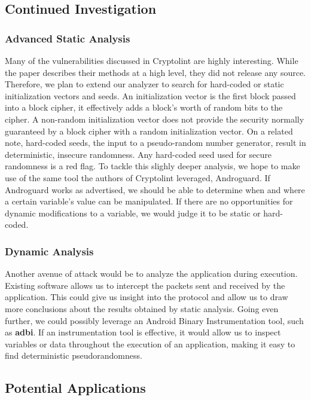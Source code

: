 \documentclass[11pt]{article}
\numberwithin{theorem}{subsection}
\begin{document}
\subsection{Continued Investigation}

\subsubsection{Advanced Static Analysis}
  Many of the vulnerabilities discussed in Cryptolint are highly interesting. While the paper describes their methods at a high level, they did not
release any source. Therefore, we plan to extend our analyzer to search for hard-coded or static initialization vectors and seeds. An initialization vector
is the first block passed into a block cipher, it effectively adds a block's worth of random bits to the cipher. A non-random initialization vector
does not provide the security normally guaranteed by a block cipher with a random initialization vector. On a related note, hard-coded seeds,
the input to a pseudo-random number generator, result in deterministic, insecure randomness. Any hard-coded seed used for secure randomness
is a red flag.
  To tackle this slighly deeper analysis, we hope to make use of the same tool the authors of Cryptolint leveraged, Androguard. If Androguard works
as advertised, we should be able to determine when and where a certain variable's value can be manipulated. If there are no opportunities for dynamic modifications
to a variable, we would judge it to be static or hard-coded.

\subsubsection{Dynamic Analysis}

  Another avenue of attack would be to analyze the application during execution. Existing software allows us to intercept the packets sent
and received by the application. This could give us insight into the protocol and allow us to draw more conclusions about the results
obtained by static analysis. Going even further, we could possibly leverage an Android Binary Instrumentation tool, such as \textbf{adbi}. If an
instrumentation tool is effective, it would allow us to inspect variables or data throughout the execution of an application, making it easy
to find deterministic pseudorandomness.

\subsection{Potential Applications}
\end{document}
